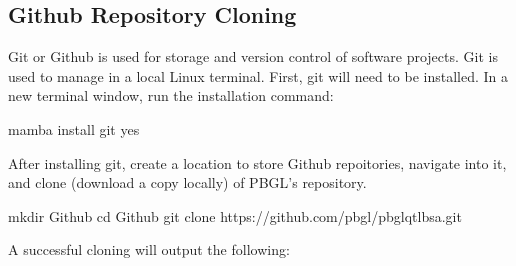 \documentclass[letterpaper,10pt,english]{sphinxhowto}
\begin{document}
\subsection{Github Repository Cloning}
\label{\detokenize{index:github-repository-cloning}}
\sphinxAtStartPar
Git or Github is used for storage and version control of software projects. Git is used to manage in a local Linux terminal. First, git will need to be installed. In a new terminal window, run the installation command:

\begin{sphinxVerbatim}[commandchars=\\\{\}]
\PYGZdl{} mamba install git \PYGZhy{}\PYGZhy{}yes
\end{sphinxVerbatim}

\sphinxAtStartPar
After installing git, create a location to store Github repoitories, navigate into it, and clone (download a copy locally) of PBGL’s  repository.

\begin{sphinxVerbatim}[commandchars=\\\{\}]
\PYGZdl{} mkdir Github
\PYGZdl{} cd Github
\PYGZdl{} git clone https://github.com/pbgl/pbgl\PYGZhy{}qtl\PYGZhy{}bsa.git
\end{sphinxVerbatim}

\sphinxAtStartPar
A successful cloning will output the following:

\begin{sphinxVerbatim}[commandchars=\\\{\}]
  
    
     
     
          
         
    
\end{sphinxVerbatim}
\end{document}
